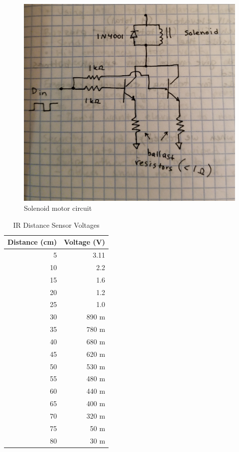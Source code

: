 \documentclass{article}
\begin{document}
	\begin{figure}[h!]
		\includegraphics[width=\linewidth]{solenoid.jpg}
		\caption{Solenoid motor circuit}
		\label{fig:solenoid}
	\end{figure}
	
    \begin{table}[h!]
  	    \begin{center}
            \caption{IR Distance Sensor Voltages}
    		\label{tab:table2}
    		\begin{tabular}{r|r}
      			\textbf{Distance (cm)} & \textbf{Voltage (V)} \\
			    \hline
      			5 & 3.11\\
      			10 & 2.2\\
      			15 & 1.6\\
      			20 & 1.2\\
				25 & 1.0\\
				30 & 890 m\\
				35 & 780 m\\
				40 & 680 m\\
				45 & 620 m\\
				50 & 530 m\\
				55 & 480 m\\
				60 & 440 m\\
				65 & 400 m\\
				70 & 320 m\\
				75 & 50 m\\
				80 & 30 m\\
   			\end{tabular}
  	    \end{center}
	\end{table}
	
\end{document}
